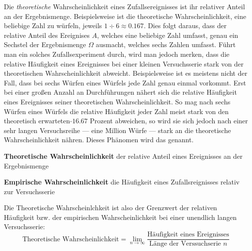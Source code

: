
Die \emph{theoretische} Wahrscheinlichkeit eines Zufallsereignisses ist ihr relativer Anteil an der Ergebnismenge. Beispielsweise ist die theoretische Wahrscheinlichkeit, eine beliebige Zahl zu w\"{u}rfeln, jeweils $1 \div 6 \approx 0.167$. Dies folgt daraus, dass der relative Anteil des Ereignises $A$, welches eine beliebige Zahl umfasst, genau ein Sechstel der Ergebnismenge $\Omega$ ausmacht, welches sechs Zahlen umfasst. F\"{u}hrt man ein solches Zufallsexperiment durch, wird man jedoch merken, dass die relative H\"{a}ufigkeit eines Ereignisses bei einer kleinen Versuchsserie stark von der theoretischen Wahrscheinlichkeit abweicht. Beispielsweise ist es meistens nicht der Fall, dass bei sechs W\"{u}rfen eines W\"{u}rfels jede Zahl genau einmal vorkommt. Erst bei einer gro\ss{}en Anzahl an Durchf\"{u}hrungen n\"{a}hert sich die relative H\"{a}ufigkeit eines Ereignisses seiner theoretischen Wahrscheinlichkeit. So mag nach sechs W\"{u}rfen eines W\"{u}rfels die relative H\"{a}ufigkeit jeder Zahl meist stark von den theoretisch erwarteten $\tilde{} 16.67$ Prozent abweichen, so wird sie sich jedoch nach einer sehr langen Versuchsreihe --- eine Million W\"{u}rfe --- stark an die theoretische Wahrscheinlichkeit n\"{a}hren. Dieses Ph\"{a}nomen wird das  genannt.

\pagebreak

\textbf{Theoretische Wahrscheinlichkeit}  der relative Anteil eines Ereignisses an der Ergebnismenge

\textbf{Empirische Wahrscheinlichkeit}  die H\"{a}ufigkeit eines Zufallsreignisses relativ zur Versuchsserie

Die Theoretische Wahrscheinlchkeit ist also der Grenzwert der relativen H\"{a}ufigkeit bzw. der empirischen Wahrscheinlichkeit bei einer unendlich langen Versuchsserie: $$\text{Theoretische Wahrscheinlichkeit} = \lim_{n \rightarrow \infty} \frac{\text{H\"{a}ufigkeit eines Ereignisses}}{\text{L\"{a}nge der Verssuchserie } n}$$

